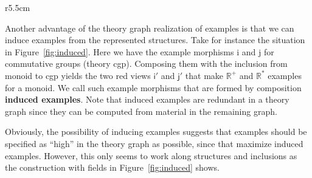 \documentclass[11pt]{bluenote}
\def\defemph{\textbf}
\begin{document}
\begin{wrapfigure}r{5.5cm}\vspace*{-1.5em}
  \caption{Induced Examples}\label{fig:induced}\vspace*{-1em}
\end{wrapfigure}
Another advantage of the theory graph realization of examples is that we can induce
examples from the represented structures. Take for instance the situation in
Figure~\ref{fig:induced}. Here we have the example morphisms \textsf{i} and \textsf{j} for
commutative groups (theory \textsf{cgp}). Composing them with the inclusion from
\textsf{monoid} to \textsf{cgp} yields the two red views $\mathsf{i}'$ and $\mathsf{j}'$
that make $\mathbb{R}^+$ and $\mathbb{R}^*$ examples for a monoid. We call such example
morphisms that are formed by composition \defemph{induced examples}. Note that induced
examples are redundant in a theory graph since they can be computed from material in the
remaining graph.

Obviously, the possibility of inducing examples suggests that examples should be specified
as ``high'' in the theory graph as possible, since that maximize induced
examples. However, this only seems to work along structures and inclusions as the
construction with fields in Figure~\ref{fig:induced} shows.
\end{document}
